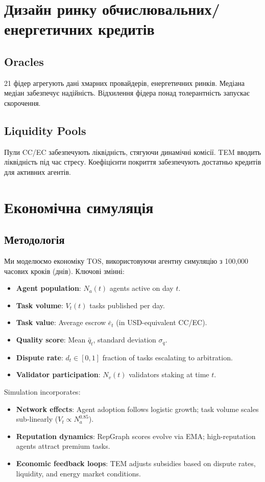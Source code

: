 \documentclass[11pt]{article}
\begin{document}
\section{Дизайн ринку обчислювальних/енергетичних кредитів}
\subsection{Oracles}
21 фідер агрегують дані хмарних провайдерів, енергетичних ринків. Медіана медіан забезпечує надійність. Відхилення фідера понад толерантність запускає скорочення.

\subsection{Liquidity Pools}
Пули CC/EC забезпечують ліквідність, стягуючи динамічні комісії. TEM вводить ліквідність під час стресу. Коефіцієнти покриття забезпечують достатньо кредитів для активних агентів.

\section{Економічна симуляція}
\label{sec:econ-sim}

\subsection{Методологія}
Ми моделюємо економіку TOS, використовуючи агентну симуляцію з 100,000 часових кроків (днів). Ключові змінні:
\begin{itemize}[noitemsep]
  \item \textbf{Agent population}: $N_a(t)$ agents active on day $t$.
  \item \textbf{Task volume}: $V_t(t)$ tasks published per day.
  \item \textbf{Task value}: Average escrow $\bar{e}_t$ (in USD-equivalent CC/EC).
  \item \textbf{Quality score}: Mean $\bar{q}_t$, standard deviation $\sigma_q$.
  \item \textbf{Dispute rate}: $d_t \in [0,1]$ fraction of tasks escalating to arbitration.
  \item \textbf{Validator participation}: $N_v(t)$ validators staking at time $t$.
\end{itemize}
Simulation incorporates:
\begin{itemize}[noitemsep]
  \item \textbf{Network effects}: Agent adoption follows logistic growth; task volume scales sub-linearly ($V_t \propto N_a^{0.85}$).
  \item \textbf{Reputation dynamics}: RepGraph scores evolve via EMA; high-reputation agents attract premium tasks.
  \item \textbf{Economic feedback loops}: TEM adjusts subsidies based on dispute rates, liquidity, and energy market conditions.
\end{itemize}
\end{document}
